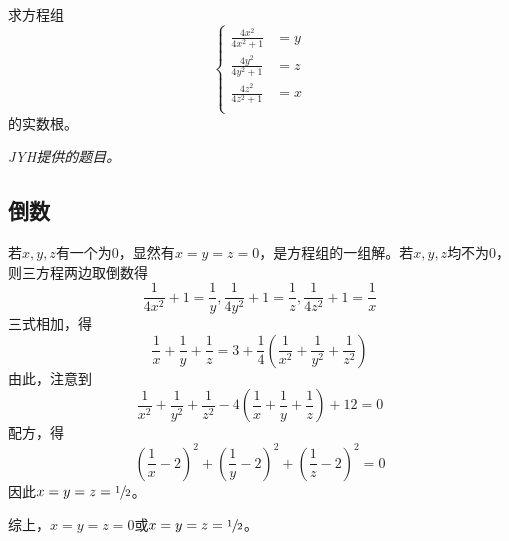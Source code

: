 

求方程组
\[ \left\{ \begin{aligned}
  \frac{4x^2}{4x^2 + 1} &= y \\
  \frac{4y^2}{4y^2 + 1} &= z \\
  \frac{4z^2}{4z^2 + 1} &= x \\
\end{aligned} \right. \]
的实数根。

\textit{JYH提供的题目。}


\subsection{倒数}

若$x, y, z$有一个为0，显然有$x = y = z = 0$，是方程组的一组解。若$x, y, z$均不为0，则三方程两边取倒数得
\[ \frac1{4x^2} + 1 = \frac1y, \frac1{4y^2} + 1 = \frac1z, \frac1{4z^2} + 1 = \frac1x \]
三式相加，得
\[ \frac1x + \frac1y + \frac1z = 3 + \frac14\left(\frac1{x^2} + \frac1{y^2} + \frac1{z^2}\right) \]
由此，注意到
\[ \frac1{x^2} + \frac1{y^2} + \frac1{z^2} - 4\left(\frac1x + \frac1y + \frac1z\right) + 12 = 0 \]
配方，得
\[ \left(\frac1x - 2\right)^2 + \left(\frac1y - 2\right)^2 + \left(\frac1z - 2\right)^2 = 0 \]
因此$x = y = z = \sfrac12$。

综上，$x = y = z = 0$或$x = y = z = \sfrac12$。
